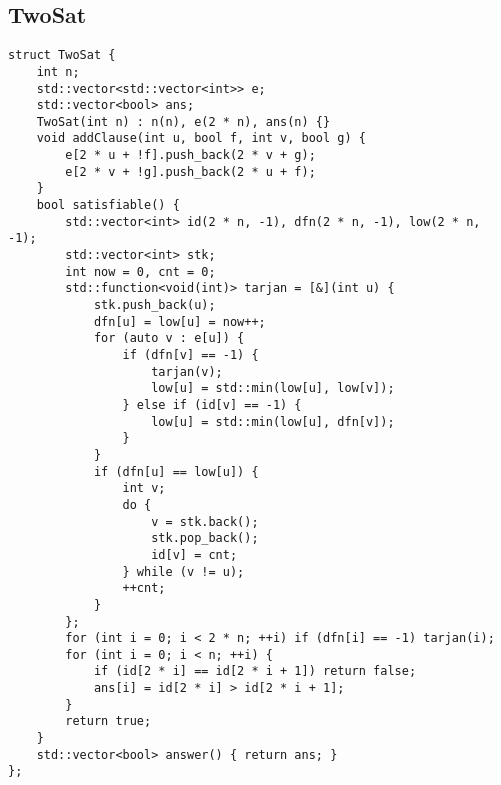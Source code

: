 \subsection{TwoSat}
\begin{lstlisting}
struct TwoSat {
    int n;
    std::vector<std::vector<int>> e;
    std::vector<bool> ans;
    TwoSat(int n) : n(n), e(2 * n), ans(n) {}
    void addClause(int u, bool f, int v, bool g) {
        e[2 * u + !f].push_back(2 * v + g);
        e[2 * v + !g].push_back(2 * u + f);
    }
    bool satisfiable() {
        std::vector<int> id(2 * n, -1), dfn(2 * n, -1), low(2 * n, -1);
        std::vector<int> stk;
        int now = 0, cnt = 0;
        std::function<void(int)> tarjan = [&](int u) {
            stk.push_back(u);
            dfn[u] = low[u] = now++;
            for (auto v : e[u]) {
                if (dfn[v] == -1) {
                    tarjan(v);
                    low[u] = std::min(low[u], low[v]);
                } else if (id[v] == -1) {
                    low[u] = std::min(low[u], dfn[v]);
                }
            }
            if (dfn[u] == low[u]) {
                int v;
                do {
                    v = stk.back();
                    stk.pop_back();
                    id[v] = cnt;
                } while (v != u);
                ++cnt;
            }
        };
        for (int i = 0; i < 2 * n; ++i) if (dfn[i] == -1) tarjan(i);
        for (int i = 0; i < n; ++i) {
            if (id[2 * i] == id[2 * i + 1]) return false;
            ans[i] = id[2 * i] > id[2 * i + 1];
        }
        return true;
    }
    std::vector<bool> answer() { return ans; }
};
\end{lstlisting}

